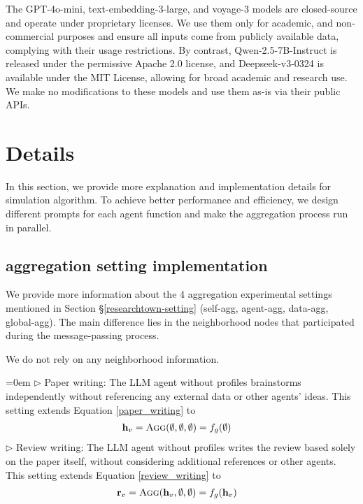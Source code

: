 The GPT-4o-mini, text-embedding-3-large, and voyage-3 models are closed-source and operate under proprietary licenses. We use them only for academic, and non-commercial purposes and ensure all inputs come from publicly available data, complying with their usage restrictions. By contrast, Qwen-2.5-7B-Instruct is released under the permissive Apache 2.0 license, and Deepseek-v3-0324 is available under the MIT License, allowing for broad academic and research use. We make no modifications to these models and use them as-is via their public APIs.


\section{\envname Details}
In this section, we provide more explanation and implementation details for \envname simulation algorithm. To achieve better performance and efficiency, we design different prompts for each agent function and make the aggregation process run in parallel.

\subsection{\envname aggregation setting implementation}
\label{agg-setting-implementation}
We provide more information about the 4 aggregation experimental settings mentioned in Section \S\ref{researchtown-setting} (\ie self-agg, agent-agg, data-agg, global-agg). The main difference lies in the neighborhood nodes that participated during the message-passing process.

We do not rely on any neighborhood information.

\hangindent=0em
$\triangleright$ Paper writing: The LLM agent without profiles brainstorms independently without referencing any external data or other agents’ ideas. This setting extends Equation \ref{paper_writing} to
\begin{equation} 
\begin{split} 
\mathbf{h}_{v} & = \textsc{Agg}(\emptyset, \emptyset, \emptyset)  = f_g(\emptyset) 
\end{split}  
\end{equation}
$\triangleright$ Review writing: The LLM agent without profiles writes the review based solely on the paper itself, without considering additional references or other agents. This setting extends Equation \ref{review_writing} to
\begin{equation} \begin{split} \mathbf{r}_{v} & = \textsc{Agg}(\mathbf{h}_v, \emptyset, \emptyset) = f_g(\mathbf{h}_v) \end{split} \label{review_writing_selfagg} \end{equation}

